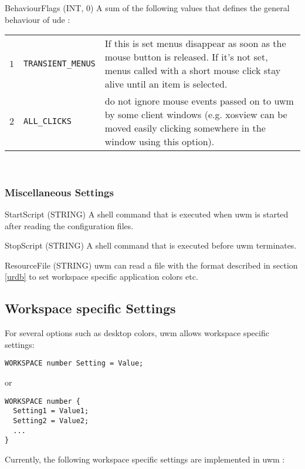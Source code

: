 \documentclass[10pt,a4paper]{article}
\newcommand{\uwm}{{\sc uwm} }
\newcommand{\ude}{{\sc ude} }
\newenvironment{ttdesc}[1]{
   \begin{list}{}{
          \renewcommand{\makelabel}[1]{\texttt{##1\hfill}}}}{\end{list}}
\begin{document}
\begin{ttdesc}{description}
\item[BehaviourFlags (INT, 0)] A sum of the following values that defines the
general behaviour of \ude:\\[\smallskipamount]
\begin{tabular}{rlp{7cm}}
$1$  & \texttt{TRANSIENT\_MENUS} & If this is set menus disappear as soon as
the mouse button is released. If it's not set, menus called with a short mouse
click stay alive until an item is selected.\\
$2$  & \texttt{ALL\_CLICKS} & do not ignore mouse events passed on to uwm by
some client windows (e.g. xosview can be moved easily clicking somewhere in
the window using this option).\\
\end{tabular}\\
\end{ttdesc}

\subsubsection{Miscellaneous Settings}
\begin{ttdesc}{description}
\item[StartScript (STRING)] A shell command that is executed when \uwm is
started after reading the configuration files.
\item[StopScript (STRING)] A shell command that is executed before \uwm
terminates.
\item[ResourceFile (STRING)] \uwm can read a file with the format described in
section \ref{urdb} to set workspace specific application colors etc.
\end{ttdesc}

\subsection{Workspace specific Settings}
For several options such as desktop colors, uwm allows workspace specific
settings:

\begin{verbatim}
WORKSPACE number Setting = Value;
\end{verbatim}

or

\begin{verbatim}
WORKSPACE number {
  Setting1 = Value1;
  Setting2 = Value2;
  ...
}
\end{verbatim}

Currently, the following workspace specific settings are implemented in \uwm:
\end{document}
